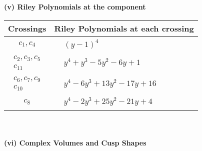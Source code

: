 \documentclass[1p]{elsarticle_modified}
\theoremstyle{definition}
\begin{document}
\newpage\renewcommand{\arraystretch}{1}
\flushleft \textbf{(v) Riley Polynomials at the component}\newline \\
\begin{tabular}{m{50pt}|m{274pt}}
Crossings & \hspace{64pt}Riley Polynomials at each crossing \\
\hline $$\begin{aligned}c_{1},c_{4}\end{aligned}$$&$\begin{aligned}
&(y-1)^4
\end{aligned}$\\
\hline $$\begin{aligned}c_{2},c_{3},c_{5}\\c_{11}\end{aligned}$$&$\begin{aligned}
&y^4+y^3-5 y^2-6 y+1
\end{aligned}$\\
\hline $$\begin{aligned}c_{6},c_{7},c_{9}\\c_{10}\end{aligned}$$&$\begin{aligned}
&y^4-6 y^3+13 y^2-17 y+16
\end{aligned}$\\
\hline $$\begin{aligned}c_{8}\end{aligned}$$&$\begin{aligned}
&y^4-2 y^3+25 y^2-21 y+4
\end{aligned}$\\
\hline
\end{tabular}\\~\\
\newpage\flushleft \textbf{(vi) Complex Volumes and Cusp Shapes}
\end{document}
